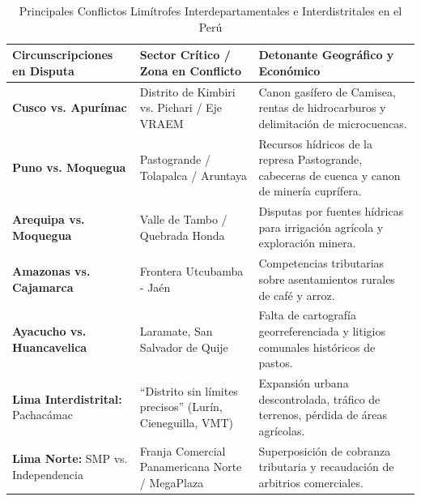 \documentclass[11pt,a4paper]{article}
\begin{document}
\begin{table}[htbp]
\centering
\small
\caption{Principales Conflictos Limítrofes Interdepartamentales e Interdistritales en el Perú}
\begin{tabularx}{\textwidth}{p{3.5cm}p{4cm}X}
\toprule
\textbf{Circunscripciones en Disputa} & \textbf{Sector Crítico / Zona en Conflicto} & \textbf{Detonante Geográfico y Económico} \\
\midrule
\textbf{Cusco vs. Apurímac} & Distrito de Kimbiri vs. Pichari / Eje VRAEM & Canon gasífero de Camisea, rentas de hidrocarburos y delimitación de microcuencas. \\
\addlinespace
\textbf{Puno vs. Moquegua} & Pastogrande / Tolapalca / Aruntaya & Recursos hídricos de la represa Pastogrande, cabeceras de cuenca y canon de minería cuprífera. \\
\addlinespace
\textbf{Arequipa vs. Moquegua} & Valle de Tambo / Quebrada Honda & Disputas por fuentes hídricas para irrigación agrícola y exploración minera. \\
\addlinespace
\textbf{Amazonas vs. Cajamarca} & Frontera Utcubamba - Jaén & Competencias tributarias sobre asentamientos rurales de café y arroz. \\
\addlinespace
\textbf{Ayacucho vs. Huancavelica} & Laramate, San Salvador de Quije & Falta de cartografía georreferenciada y litigios comunales históricos de pastos. \\
\addlinespace
\textbf{Lima Interdistrital:} Pachacámac & ``Distrito sin límites precisos'' (Lurín, Cieneguilla, VMT) & Expansión urbana descontrolada, tráfico de terrenos, pérdida de áreas agrícolas. \\
\addlinespace
\textbf{Lima Norte:} SMP vs. Independencia & Franja Comercial Panamericana Norte / MegaPlaza & Superposición de cobranza tributaria y recaudación de arbitrios comerciales. \\
\bottomrule
\end{tabularx}
\end{table}
\end{document}
